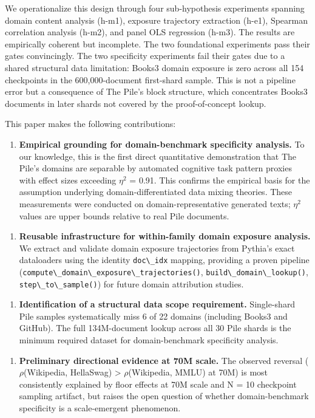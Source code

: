 We operationalize this design through four sub-hypothesis experiments spanning domain content analysis (h-m1), exposure trajectory extraction (h-e1), Spearman correlation analysis (h-m2), and panel OLS regression (h-m3). The results are empirically coherent but incomplete. The two foundational experiments pass their gates convincingly. The two specificity experiments fail their gates due to a shared structural data limitation: Books3 domain exposure is zero across all 154 checkpoints in the 600,000-document first-shard sample. This is not a pipeline error but a consequence of The Pile's block structure, which concentrates Books3 documents in later shards not covered by the proof-of-concept lookup.

This paper makes the following contributions:

\begin{enumerate}
\item \textbf{Empirical grounding for domain-benchmark specificity analysis.} To our knowledge, this is the first direct quantitative demonstration that The Pile's domains are separable by automated cognitive task pattern proxies with effect sizes exceeding $\eta^2$ = 0.91. This confirms the empirical basis for the assumption underlying domain-differentiated data mixing theories. These measurements were conducted on domain-representative generated texts; $\eta^2$ values are upper bounds relative to real Pile documents.
\end{enumerate}

\begin{enumerate}
\item \textbf{Reusable infrastructure for within-family domain exposure analysis.} We extract and validate domain exposure trajectories from Pythia's exact dataloaders using the identity \texttt{doc\textbackslash \_idx} mapping, providing a proven pipeline (\texttt{compute\textbackslash \_domain\textbackslash \_exposure\textbackslash \_trajectories()}, \texttt{build\textbackslash \_domain\textbackslash \_lookup()}, \texttt{step\textbackslash \_to\textbackslash \_sample()}) for future domain attribution studies.
\end{enumerate}

\begin{enumerate}
\item \textbf{Identification of a structural data scope requirement.} Single-shard Pile samples systematically miss 6 of 22 domains (including Books3 and GitHub). The full 134M-document lookup across all 30 Pile shards is the minimum required dataset for domain-benchmark specificity analysis.
\end{enumerate}

\begin{enumerate}
\item \textbf{Preliminary directional evidence at 70M scale.} The observed reversal ($\rho$(Wikipedia, HellaSwag) > $\rho$(Wikipedia, MMLU) at 70M) is most consistently explained by floor effects at 70M scale and N = 10 checkpoint sampling artifact, but raises the open question of whether domain-benchmark specificity is a scale-emergent phenomenon.
\end{enumerate}


